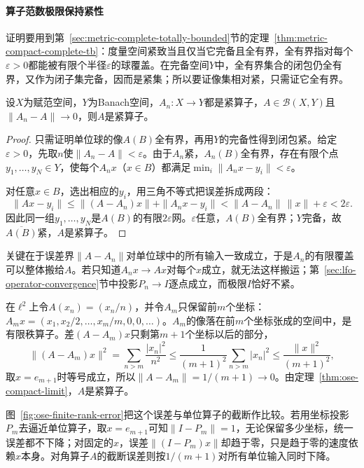 \paragraph{算子范数极限保持紧性}
证明要用到第~\ref{sec:metric-complete-totally-bounded}节的定理~\ref{thm:metric-compact-complete-tb}：度量空间紧致当且仅当它完备且全有界，全有界指对每个$\varepsilon>0$都能被有限个半径$\varepsilon$的球覆盖。在完备空间$Y$中，全有界集合的闭包仍全有界，又作为闭子集完备，因而是紧集；所以要证像集相对紧，只需证它全有界。

\begin{theorem}[紧算子集合在算子范数下闭]
\label{thm:ose-compact-limit}
设$X$为赋范空间，$Y$为Banach空间，$A_n:X\to Y$都是紧算子，$A\in\mathcal B(X,Y)$且$\|A_n-A\|\to0$，则$A$是紧算子。
\end{theorem}

\begin{proof}
只需证明单位球的像$A(B)$全有界，再用$Y$的完备性得到闭包紧。给定$\varepsilon>0$，先取$n$使$\|A_n-A\|<\varepsilon$。由于$A_n$紧，$A_n(B)$全有界，存在有限个点$y_1,\ldots,y_N\in Y$，使每个$A_nx$（$x\in B$）都满足$\min_i\|A_nx-y_i\|<\varepsilon$。

对任意$x\in B$，选出相应的$y_i$，用三角不等式把误差拆成两段：
\[
  \|Ax-y_i\|\leq\|(A-A_n)x\|+\|A_nx-y_i\|<\|A-A_n\|\,\|x\|+\varepsilon<2\varepsilon .
\]
因此同一组$y_1,\ldots,y_N$是$A(B)$的有限$2\varepsilon$网。$\varepsilon$任意，$A(B)$全有界；$Y$完备，故$\overline{A(B)}$紧，$A$是紧算子。
\end{proof}

关键在于误差界$\|A-A_n\|$对单位球中的所有输入一致成立，于是$A_n$的有限覆盖可以整体搬给$A$。若只知道$A_nx\to Ax$对每个$x$成立，就无法这样搬运；第~\ref{sec:lfo-operator-convergence}节中投影$P_n\to I$逐点成立，而极限$I$恰好不紧。

\begin{example}[对角算子的有限秩逼近]
\label{ex:ose-diagonal-finite-rank}
在$\ell^2$上令$A(x_n)=(x_n/n)$，并令$A_m$只保留前$m$个坐标：$A_mx=(x_1,x_2/2,\ldots,x_m/m,0,0,\ldots)$。$A_m$的像落在前$m$个坐标张成的空间中，是有限秩算子。差$(A-A_m)x$只剩第$m+1$个坐标以后的部分，
\[
  \|(A-A_m)x\|^2=\sum_{n>m}\frac{|x_n|^2}{n^2}\leq\frac{1}{(m+1)^2}\sum_{n>m}|x_n|^2\leq\frac{\|x\|^2}{(m+1)^2},
\]
取$x=e_{m+1}$时等号成立，所以$\|A-A_m\|=1/(m+1)\to0$。由定理~\ref{thm:ose-compact-limit}，$A$是紧算子。
\end{example}

图~\ref{fig:ose-finite-rank-error}把这个误差与单位算子的截断作比较。若用坐标投影$P_m$去逼近单位算子，取$x=e_{m+1}$可知$\|I-P_m\|=1$，无论保留多少坐标，统一误差都不下降；对固定的$x$，误差$\|(I-P_m)x\|$却趋于零，只是趋于零的速度依赖$x$本身。对角算子$A$的截断误差则按$1/(m+1)$对所有单位输入同时下降。

